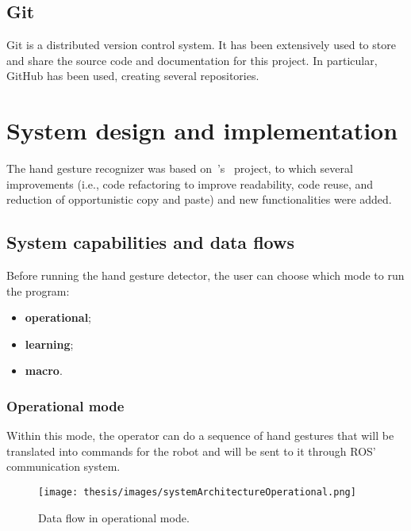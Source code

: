 \documentclass[../thesis.tex]{subfiles}
\begin{document}
\subsection{Git}
Git is a distributed version control system. It has been extensively used to store and share the source code and documentation for this project. In particular, GitHub has been used, creating several repositories.

\section{System design and implementation}\label{sec:system_design_and_implementation}
The hand gesture recognizer was based on~\citeauthor{site:hand_gesture_base_repo}'s~\cite{site:hand_gesture_base_repo} project, to which several improvements (i.e., code refactoring to improve readability, code reuse, and reduction of opportunistic copy and paste) and new functionalities were added.

\subsection{System capabilities and data flows}
Before running the hand gesture detector, the user can choose which mode to run the program:
\begin{itemize}
    \item \textbf{operational};
    \item \textbf{learning};
    \item \textbf{macro}.
\end{itemize}

\subsubsection{Operational mode}\label{sss:operational_mode}
Within this mode, the operator can do a sequence of hand gestures that will be translated into commands for the robot and will be sent to it through \acrshort{ROS}' communication system.
\begin{figure}[H]
    \centering
    \texttt{[image: thesis/images/systemArchitectureOperational.png]}
    \caption{Data flow in operational mode.}
    \label{fig:system_architecture_operational}
\end{figure}
\end{document}
